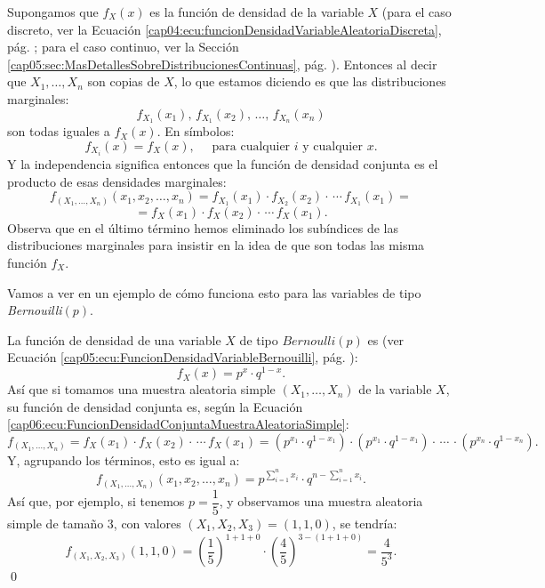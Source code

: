 Supongamos que $f_X(x)$ es la función de densidad de la variable $X$  (para el caso discreto, ver la Ecuación \ref{cap04:ecu:funcionDensidadVariableAleatoriaDiscreta}, pág. \pageref{cap04:ecu:funcionDensidadVariableAleatoriaDiscreta}; para el caso continuo, ver la Sección \ref{cap05:sec:MasDetallesSobreDistribucionesContinuas}, pág. \pageref{cap05:sec:MasDetallesSobreDistribucionesContinuas}). Entonces al decir que $X_1, \ldots, X_n$ son copias de $X$, lo que estamos diciendo es que las distribuciones marginales:
\[f_{X_1}(x_1),\,f_{X_1}(x_2),\,\ldots,\,f_{X_n}(x_n)\]
son todas iguales a $f_X(x)$. En símbolos:
\[f_{X_i}(x) = f_{X}(x),\quad\mbox{ para cualquier $i$ y cualquier $x$.}\]
Y la independencia significa entonces que la función de densidad conjunta es el producto de esas densidades marginales:
\begin{equation}
\label{cap06:ecu:FuncionDensidadConjuntaMuestraAleatoriaSimple}
f_{(X_1,\ldots,X_n)}(x_1,x_2,\ldots,x_n)=
f_{X_1}(x_1)\cdot f_{X_2}(x_2)\cdot\,\cdots\, f_{X_1}(x_1)=
\end{equation}
\[= f_{X}(x_1)\cdot f_{X}(x_2)\cdot\,\cdots\, f_{X}(x_1).\]
Observa que en el último término hemos eliminado los subíndices de las distribuciones marginales para insistir en la idea de que son todas las misma función $f_X$.

Vamos a ver en un ejemplo de cómo funciona esto para las variables de tipo {\em Bernouilli$(p)$}.
\begin{ejemplo}
\label{cap06:ejem:FuncionDensidadConjuntaMuestraAleatoriaSimpleBernouilli}
La función de densidad de una variable $X$ de tipo $Bernoulli(p)$ es
(ver Ecuación \ref{cap05:ecu:FuncionDensidadVariableBernouilli}, pág. \pageref{cap05:ecu:FuncionDensidadVariableBernouilli}):
\[
f_X(x)=p^{x}\cdot q^{1-x}.
\]
Así que si tomamos una muestra aleatoria simple $(X_1,\ldots,X_n)$ de la variable $X$, su función de densidad conjunta es, según la Ecuación \ref{cap06:ecu:FuncionDensidadConjuntaMuestraAleatoriaSimple}:
\[
f_{(X_1,\ldots,X_n)}=
f_{X}(x_1)\cdot f_{X}(x_2)\cdot\,\cdots\, f_{X}(x_1)=
(p^{x_1}\cdot q^{1-x_1})\cdot (p^{x_1}\cdot q^{1-x_1})\cdot\,\cdots\,\cdot(p^{x_n}\cdot q^{1-x_n})
.
\]
Y, agrupando los términos, esto es igual a:
\[
f_{(X_1,\ldots,X_n)}(x_1,x_2,\ldots,x_n)=
p^{\sum_{i=1}^n x_i}\cdot q^{n-\sum_{i=1}^n x_i}.
\]
Así que, por ejemplo, si tenemos $p=\dfrac{1}{5}$, y observamos una muestra aleatoria simple de tamaño $3$, con valores $(X_1,X_2,X_3)=(1,1,0)$, se tendría:
\[
f_{(X_1,X_2,X_3)}(1,1,0)=
\left(\dfrac{1}{5}\right)^{1+1+0}\cdot \left(\dfrac{4}{5}\right)^{3-(1+1+0)}=\dfrac{4}{5^3}.
\]
\qed
\end{ejemplo}

